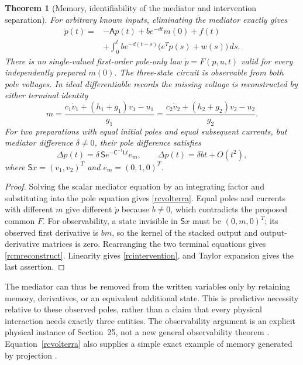 \documentclass[11pt,letterpaper]{article}
\newtheorem{theorem}{Theorem}[section]
\theoremstyle{definition}
\numberwithin{equation}{section}
\begin{document}
\begin{theorem}[Memory, identifiability of the mediator and intervention separation]\label{rcmemory}
For arbitrary known inputs, eliminating the mediator exactly gives
\begin{equation}\label{rcvolterra}
\begin{split}
\dot p(t)={}&-\mathsf A p(t)+b e^{-dt}m(0)+f(t)\\
&+\int_0^t b e^{-d(t-s)}\big(e^Tp(s)+w(s)\big)\,ds.
\end{split}
\end{equation}
There is no single-valued first-order pole-only law $\dot p=F(p,u,t)$ valid for every independently prepared $m(0)$. The three-state circuit is observable from both pole voltages. In ideal differentiable records the missing voltage is reconstructed by either terminal identity
\begin{equation}\label{rcmreconstruct}
m=\frac{c_1\dot v_1+(h_1+g_1)v_1-u_1}{g_1}
 =\frac{c_2\dot v_2+(h_2+g_2)v_2-u_2}{g_2}.
\end{equation}
For two preparations with equal initial poles and equal subsequent currents, but mediator difference $\delta\ne0$, their pole difference satisfies
\begin{equation}\label{rcintervention}
\Delta p(t)=\delta\,\mathsf S e^{-\mathsf C^{-1}\mathsf L t}e_m,
\qquad \Delta p(t)=\delta b t+O(t^2),
\end{equation}
where $\mathsf Sx=(v_1,v_2)^T$ and $e_m=(0,1,0)^T$.
\end{theorem}
\begin{proof}
Solving the scalar mediator equation by an integrating factor and substituting into the pole equation gives \eqref{rcvolterra}. Equal poles and currents with different $m$ give different $\dot p$ because $b\ne0$, which contradicts the proposed common $F$. For observability, a state invisible in $\mathsf Sx$ must be $(0,m,0)^T$; its observed first derivative is $bm$, so the kernel of the stacked output and output-derivative matrices is zero. Rearranging the two terminal equations gives \eqref{rcmreconstruct}. Linearity gives \eqref{rcintervention}, and Taylor expansion gives the last assertion.
\end{proof}
The mediator can thus be removed from the written variables only by retaining memory, derivatives, or an equivalent additional state. This is predictive necessity relative to these observed poles, rather than a claim that every physical interaction needs exactly three entities. The observability argument is an explicit physical instance of Section~25, not a new general observability theorem \cite{kalman}. Equation~\eqref{rcvolterra} also supplies a simple exact example of memory generated by projection \cite{zwanzig}.
\end{document}
